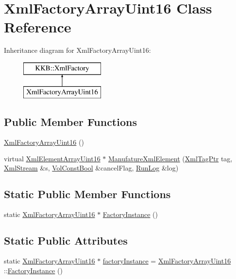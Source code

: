 \hypertarget{class_xml_factory_array_uint16}{}\section{Xml\+Factory\+Array\+Uint16 Class Reference}
\label{class_xml_factory_array_uint16}
Inheritance diagram for Xml\+Factory\+Array\+Uint16\+:\begin{figure}[H]
\begin{center}
\leavevmode
\includegraphics[height=2.000000cm]{class_xml_factory_array_uint16}
\end{center}
\end{figure}
\subsection*{Public Member Functions}
\begin{DoxyCompactItemize}
\item 
\hyperlink{class_xml_factory_array_uint16_a17e07dc08dc211393c26f78bcd3c4b8b}{Xml\+Factory\+Array\+Uint16} ()
\item 
virtual \hyperlink{class_k_k_b_1_1_xml_element_array_uint16}{Xml\+Element\+Array\+Uint16} $\ast$ \hyperlink{class_xml_factory_array_uint16_acca9f5f93c8ef4db069768c6e784a50a}{Manufature\+Xml\+Element} (\hyperlink{namespace_k_k_b_a9253a3ea8a5da18ca82be4ca2b390ef0}{Xml\+Tag\+Ptr} tag, \hyperlink{class_k_k_b_1_1_xml_stream}{Xml\+Stream} \&s, \hyperlink{namespace_k_k_b_a7d390f568e2831fb76b86b56c87bf92f}{Vol\+Const\+Bool} \&cancel\+Flag, \hyperlink{class_k_k_b_1_1_run_log}{Run\+Log} \&log)
\end{DoxyCompactItemize}
\subsection*{Static Public Member Functions}
\begin{DoxyCompactItemize}
\item 
static \hyperlink{class_xml_factory_array_uint16}{Xml\+Factory\+Array\+Uint16} $\ast$ \hyperlink{class_xml_factory_array_uint16_a66affc524ff93cbfe96a651e0762e542}{Factory\+Instance} ()
\end{DoxyCompactItemize}
\subsection*{Static Public Attributes}
\begin{DoxyCompactItemize}
\item 
static \hyperlink{class_xml_factory_array_uint16}{Xml\+Factory\+Array\+Uint16} $\ast$ \hyperlink{class_xml_factory_array_uint16_ac6b41edd391a83e303ec3d892631e5e9}{factory\+Instance} = \hyperlink{class_xml_factory_array_uint16}{Xml\+Factory\+Array\+Uint16} \+::\hyperlink{class_xml_factory_array_uint16_a66affc524ff93cbfe96a651e0762e542}{Factory\+Instance} ()
\end{DoxyCompactItemize}


